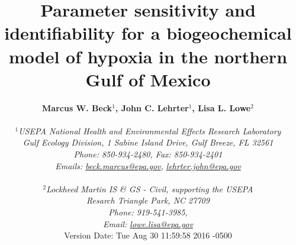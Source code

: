 \documentclass[letterpaper,12pt,oneside]{article}\usepackage[]{graphicx}\usepackage[]{color}
\begin{document}
\raggedbottom
\linenumbers
\raggedright
{}
\setlength{\parindent}{0.5in}
\renewcommand\refname{References \vspace{12pt}}

\begin{singlespace}
\title{{\bf {\Large Parameter sensitivity and identifiability for a biogeochemical model of hypoxia in the northern {G}ulf of {M}exico}}}
\author{
  {\bf {\normalsize Marcus W. Beck$^1$, John C. Lehrter$^1$, Lisa L. Lowe$^2$}}
  \\\\{\textit {\normalsize $^1$USEPA National Health and Environmental Effects Research Laboratory}}
  \\{\textit {\normalsize Gulf Ecology Division, 1 Sabine Island Drive, Gulf Breeze, FL 32561}}
	\\{\textit {\normalsize Phone: 850-934-2480, Fax: 850-934-2401}}
	\\{\textit {\normalsize Emails: \href{mailto:beck.marcus@epa.gov}{beck.marcus@epa.gov}, \href{mailto:lehrter.john@epa.gov}{lehrter.john@epa.gov}}}
	\\\\{\textit {\normalsize $^2$Lockheed Martin IS \& GS - Civil, supporting the USEPA}}
	\\{\textit {\normalsize Resarch Triangle Park, NC 27709}}
	\\{\textit {\normalsize Phone: 919-541-3985,}}
	\\{\textit {\normalsize Email: \href{mailto:lowe.lisa@epa.gov}{lowe.lisa@epa.gov}}}
  \vspace{1in} 
  \\ Version Date:   Tue Aug 30 11:59:58 2016 -0500
	}
\date{}
\maketitle
\end{singlespace}
\clearpage
\end{document}
